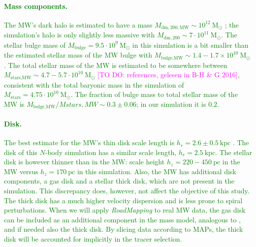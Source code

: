 \documentclass[iop,revtex4,numberedappendix,appendixfloats]{emulateapj}
\newcommand{\RM}{{\sl RoadMapping}}
\newcommand{\Wilma}[1]{\textcolor{Magenta}{#1}}
\newcommand{\NEW}[1]{\textcolor{Green}{#1}}
\begin{document}
\NEW{\paragraph{Mass components.} The MW's dark halo is estimated to have a mass $M_{\text{dm},200,\text{MW}}\sim10^{12}~\text{M}_\odot$ \citep{2016ARA&A..54..529B}; the simulation's halo is only slightly less massive with $M_{\text{dm},200}\sim7\cdot10^{11}~\text{M}_\odot$. The stellar bulge mass of $M_\text{bulge}=9.5\cdot 10^9~\text{M}_\odot$ in this simulation is a bit smaller than the estimated stellar mass of the MW bulge with $M_\text{bulge,MW} \sim1.4-1.7 \times 10^{10}~\text{M}_\odot$ \citep{2015MNRAS.448..713P}. The total stellar mass of the MW is estimated to be somewhere between $M_\text{stars,MW}\sim4.7-5.7\cdot 10^{10}~  \text{M}_\odot$ \Wilma{[TO DO: references, gelesen in B-H \& G 2016]}, consistent with the total baryonic mass in the simulation of $M_\text{stars}=4.75\cdot10^{10}~  \text{M}_\odot$. The fraction of bulge mass to total stellar mass of the MW is $M_\text{bulge,MW}/M{stars,MW}\sim0.3\pm0.06$; in our simulation it is $0.2$.}

\NEW{\paragraph{Disk.} The best estimate for the MW's thin disk scale length is $h_r = 2.6 \pm 0.5~\text{kpc}$ \citep{2016ARA&A..54..529B}. The disk of this $N$-body simulation has a similar scale length, $h_r = 2.5~\text{kpc}$. The stellar disk is however thinner than in the MW: scale height $h_z=220-450~\text{pc}$ in the MW \citep{2016ARA&A..54..529B} versus $h_z=170~\text{pc}$ in this simulation. Also, the MW has additional disk components, a gas disk and a stellar thick disk, which are not present in the simulation. This discrepancy does, however, not affect the objective of this study. The thick disk has a much higher velocity dispersion and is less prone to spiral perturbations. When we will apply \RM{} to real MW data, the gas disk can be included as an additional component in the mass model, analogous to \citet{2013ApJ...779..115B}, and if needed also the thick disk. By slicing data according to MAPs, the thick disk will be accounted for implicitly in the tracer selection.}
\end{document}
